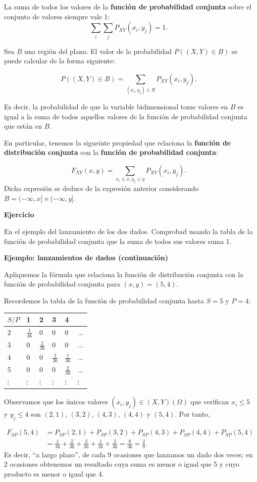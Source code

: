\documentclass[]{book}
\begin{document}
La suma de todos los valores de la \textbf{función de probabilidad conjunta} sobre el conjunto de valores siempre vale 1: \[\sum_{i}\sum_j P_{XY}(x_i,y_j)=1.\]

Sea \(B\) una región del plano. El valor de la probabilidad \(P((X,Y)\in B)\) se puede calcular de la forma siguiente:

\[
P((X,Y)\in B) =\sum_{(x_i,y_j)\in B} P_{XY}(x_i,y_j).
\]

Es decir, la probabilidad de que la variable bidimensional tome valores en \(B\) es igual a la suma de todos aquellos valores de la función de probabilidad conjunta que están en \(B\).

En particular, tenemos la sigueinte propiedad que relaciona la \textbf{función de distribución conjunta} con la \textbf{función de probabilidad conjunta}:

\[
F_{XY}(x,y)=\sum_{x_i\leq x, y_j\leq y} P_{XY}(x_i,y_j).
\]
Dicha expresión se deduce de la expresión anterior considerando \(B=(-\infty,x]\times (-\infty,y]\).

\textbf{Ejercicio}

En el ejemplo del lanzamiento de los dos dados. Comprobad usando la tabla de la función de probabilidad conjunta que la suma de todos sus valores suma 1.

\textbf{Ejemplo: lanzamientos de dados (continuación)}

Apliquemos la fórmula que relaciona la función de distribución conjunta con la función de probabilidad conjunta para \((x,y)=(5,4)\).

Recordemos la tabla de la función de probabilidad conjunta hasta \(S=5\) y \(P=4\):

\begin{longtable}[]{@{}llllll@{}}
\toprule
\(S/P\) & 1 & 2 & 3 & 4 &\tabularnewline
\midrule
\endhead
2 & \(\frac{1}{36}\) & 0 & 0 & 0 & \(\ldots\)\tabularnewline
3 & 0 & \(\frac{2}{36}\) & 0 & 0 & \(\ldots\)\tabularnewline
4 & 0 & 0 & \(\frac{2}{36}\) & \(\frac{1}{36}\) & \(\ldots\)\tabularnewline
5 & 0 & 0 & 0 & \(\frac{2}{36}\) & \(\ldots\)\tabularnewline
\(\vdots\) & \(\vdots\) & \(\vdots\) & \(\vdots\) & \(\vdots\) & \(\vdots\)\tabularnewline
\bottomrule
\end{longtable}

Observamos que los únicos valores \((x_i,y_j)\in (X,Y)(\Omega)\) que verifican \(x_i\leq 5\) y \(y_j\leq 4\) son \((2,1)\), \((3,2)\), \((4,3)\), \((4,4)\) y \((5,4)\). Por tanto,

\[
\begin{array}{rl}
F_{SP}(5,4) &= P_{SP}(2,1)+P_{SP}(3,2)+P_{SP}(4,3)+P_{SP}(4,4)+P_{SP}(5,4) \\ & = \frac{1}{36}+\frac{2}{36}+\frac{2}{36}+\frac{1}{36}+\frac{2}{36} = \frac{8}{36}=\frac{2}{9}.
\end{array}
\]
Es decir, ``a largo plazo'', de cada 9 ocasiones que lanzamos un dado dos veces; en 2 ocasiones obtenemos un resultado cuya suma es menor o igual que 5 y cuyo producto es menor o igual que 4.
\end{document}
